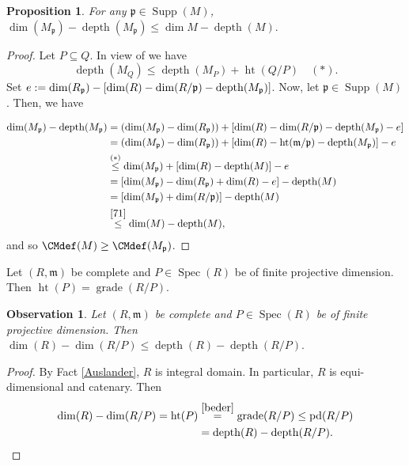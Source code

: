 \documentclass[11.05pt,a4paper]{amsart}
\newtheorem{proposition}[theorem]{Proposition}
\newtheorem{observation}[theorem]{Observation}\newcommand{\up}[1]{{{}^{#1}\!}}
\theoremstyle{definition}
\theoremstyle{remark}
\newcommand{\grade}{\operatorname{grade}}
\newcommand{\Spec}{\operatorname{Spec}}
\newcommand{\Ht}{\operatorname{ht}}
\newcommand{\pd}{\operatorname{pd}}
\newcommand{\Supp}{\operatorname{Supp}}
\newcommand{\depth}{\operatorname{depth}}
\newcommand{\fm}{\frak{m}}
\newcommand{\fp}{\frak{p}}
\begin{document}
\begin{proposition}
For any $\mathfrak{p} \in \Supp(M)$,
	\(\dim(M_{\mathfrak{p}}) - \depth(M_{\mathfrak{p}})
\leq  \dim M - \depth(M).
	\)
\end{proposition}
\begin{proof}Let $P\subseteq Q$.
In view of \cite[9.3.4]{BSh} we have 
\[\depth(M_{Q}) \leq  \depth(M_P)+\Ht(Q/P)
\quad(\ast).
\]
Set
$e:= \dim(R_{\mathfrak{p}})  -[\dim(R)-\dim(R/\fp)-\depth(M_{\mathfrak{p}})]$. Now, let $\mathfrak{p} \in \Supp(M)$. Then, we have

\begin{align*}	\dim(M_{\mathfrak{p}}) - \depth(M_{\mathfrak{p}})
	&=(\dim(M_{\mathfrak{p}}) - \dim(R_{\mathfrak{p}}))+[\dim(R)-\dim(R/\fp)-\depth(M_{\mathfrak{p}})-e]\\
	&=(\dim(M_{\mathfrak{p}}) - \dim(R_{\mathfrak{p}}))+[\dim(R)-\Ht(\fm/ \fp)-\depth(M_{\mathfrak{p}})]-e\\
	&\stackrel{(\ast)}\leq   \dim(M_{\mathfrak{p}})+[\dim(R)-\depth(M)]-e\\
	&=[\dim(M_{\mathfrak{p}})-\dim(R_{\mathfrak{p}})+\dim(R)-e] -\depth(M)\\
	&=[\dim(M_{\mathfrak{p}})+\dim(R/{\mathfrak{p}})]-\depth(M) \\
	&\stackrel{\ref{71}}\leq\dim (M )- \depth(M),
	\end{align*}
	and so $\CMdef(M)\geq \CMdef(M_{\mathfrak{p}})$.
\end{proof}
\begin{fact}
\label{beder}	Let $(R,\mathfrak{m})$ be complete   and $P\in\Spec(R)$ be of finite projective dimension. Then $\Ht(P)  = \grade(R/P)$.
\end{fact}

\begin{observation}\label{8}
	Let $(R,\mathfrak{m})$ be complete   and $P\in\Spec(R)$ be of finite projective dimension. Then  
	\(
\dim(R)-\dim(R/P)\leq \depth(R) - \depth(R/P).
	\)
\end{observation}

\begin{proof}
By {Fact}
\ref{Auslander}, $R$ is integral domain. In particular, $R$ is equi-dimensional and catenary. Then
	\begin{align*}
	\dim(R)-\dim(R/P)
	=  \Ht(P)  
	&\stackrel{\ref{beder}}= \grade(R/P) \leq\pd(R/P) \\
	&= \depth(R) - \depth(R/P).
	\end{align*}
\end{proof}
\end{document}
